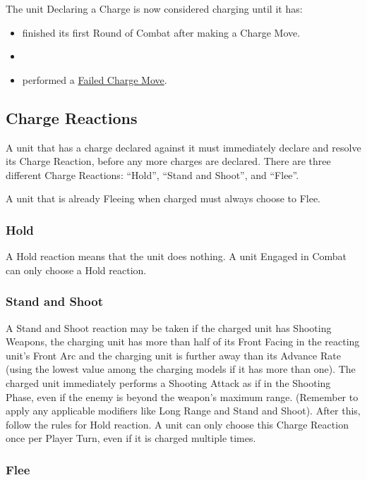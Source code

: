 The unit Declaring a Charge is now considered charging until it has:

\begin{itemize}[label={-}]
\item finished its first Round of Combat after making a Charge Move.
\item {}
\item performed a \hyperref[failed_charge]{Failed Charge Move}.
\end{itemize}

\subsection{Charge Reactions}
\label{charge_reactions}

A unit that has a charge declared against it must immediately declare and resolve its Charge Reaction, before any more charges are declared. There are three different Charge Reactions: \enquote{Hold}, \enquote{Stand and Shoot}, and \enquote{Flee}.

A unit that is already Fleeing when charged must always choose to Flee.

\subsubsection{Hold}

A Hold reaction means that the unit does nothing. A unit Engaged in Combat can only choose a Hold reaction.

\subsubsection{Stand and Shoot}

A Stand and Shoot reaction may be taken if the charged unit has Shooting Weapons, the charging unit has more than half of its Front Facing in the reacting unit's Front Arc and the charging unit is further away than its Advance Rate (using the lowest value among the charging models if it has more than one). The charged unit immediately performs a Shooting Attack as if in the Shooting Phase, even if the enemy is beyond the weapon's maximum range. (Remember to apply any applicable modifiers like Long Range and Stand and Shoot). After this, follow the rules for Hold reaction. A unit can only choose this Charge Reaction once per Player Turn, even if it is charged multiple times.

\subsubsection{Flee}

